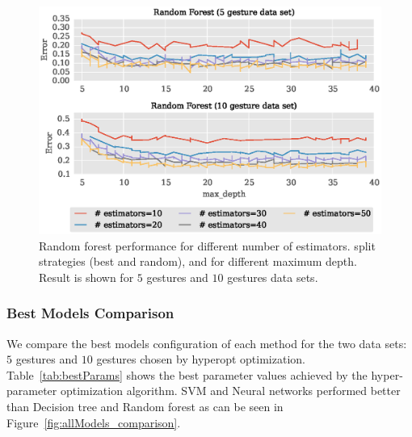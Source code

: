 \documentclass{article}
\begin{document}
\begin{figure}[th]
\vskip 0.1in
\begin{center}
\centerline{\includegraphics[width=\columnwidth]{randomForest_estimators.eps}}
\caption{Random forest performance for different number of estimators. split strategies (best and random), and for different maximum depth. Result is shown for $5$ gestures and $10$ gestures data sets.}
\label{fig:randomForest_estimators}
\end{center}
\vskip -0.2in
\end{figure}

\subsubsection{Best Models Comparison}

We compare the best models configuration of each method for the two data sets: $5$ gestures and $10$ gestures chosen by hyperopt optimization. Table~\ref{tab:bestParams} shows the best parameter values achieved by the hyper-parameter optimization algorithm. SVM and Neural networks performed better than Decision tree and Random forest as can be seen in Figure~\ref{fig:allModels_comparison}.
\end{document}
